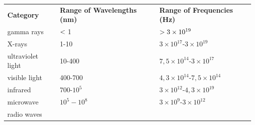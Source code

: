          \begin{table}[H]
        \begin{center}
      \label{m38778*uid8}
    \noindent
      \tablelasttail{}
      \begin{xtabular}[t]{|l|l|l|}\hline
                \textbf{Category}
               &
                \textbf{Range of Wavelengths (nm)}
               &
                \textbf{Range of Frequencies (Hz)}
     \tabularnewline{}
        gamma rays &
        $<{}$1 &
                $>{}3\times{10}^{19}$
     \tabularnewline{}
        X-rays &
        1-10 &
        $3\ensuremath{\times}{10}^{17}$-$3\ensuremath{\times}{10}^{19}$%
     \tabularnewline{}
        ultraviolet light &
        10-400 &
        $7,5\ensuremath{\times}{10}^{14}$-$3\ensuremath{\times}{10}^{17}$%
     \tabularnewline{}
        visible light &
        400-700 &
        $4,3\ensuremath{\times}{10}^{14}$-$7,5\ensuremath{\times}{10}^{14}$%
     \tabularnewline{}
        infrared &
        700-${10}^{5}$ &
        $3\ensuremath{\times}{10}^{12}$-$4,3\ensuremath{\times}{10}^{19}$%
     \tabularnewline{}
        microwave &
                ${10}^{5}-{10}^{8}$
               &
        $3\ensuremath{\times}{10}^{9}$-$3\ensuremath{\times}{10}^{12}$%
     \tabularnewline{}
        radio waves &

\end{xtabular}
\end{center}
\end{table}
